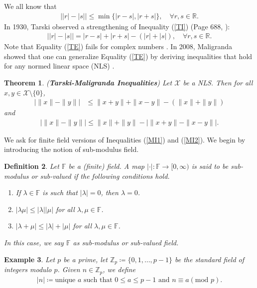 \documentclass{amsart}
\newtheorem{theorem}{Theorem}[section]
\newtheorem{definition}[theorem]{Definition}
\newtheorem{example}[theorem]{Example}
\begin{document}
We all know that 
\begin{align}\label{TI}
	\bigg||r|-|s|\bigg|\leq \min\{|r-s|, |r+s|\}, \quad \forall r, s \in \mathbb{R}.
\end{align}
In 1930, Tarski observed  a strengthening of Inequality (\ref{TI}) (Page 688, \cite{TARSKI}):
\begin{align}\label{TE}
		\bigg||r|-|s|\bigg|=|r-s|+ |r+s|-(|r|+|s|), \quad \forall r, s \in \mathbb{R}.
\end{align}
Note that  Equality (\ref{TE}) fails for complex numbers \cite{MALIGRANDA}. In 2008, Maligranda showed that one can generalize Equality (\ref{TE}) by deriving  inequalities that hold for any normed linear space (NLS) \cite{MALIGRANDA}.
\begin{theorem} \cite{MALIGRANDA} \label{MT} (\textbf{Tarski-Maligranda Inequalities})
Let $\mathcal{X}$ be a NLS. Then for all $x, y \in \mathcal{X}\setminus\{0\}$, 
\begin{align}\label{MI1}
	\bigg|\|x\|-\|y\|\bigg|&\leq \|x+y\|+\|x-y\|-(\|x\|+\|y\|)
\end{align}
and 
\begin{align}\label{MI2}
	\bigg|\|x\|-\|y\|\bigg|\leq \|x\|+\|y\|-\bigg|\|x+y\|-\|x-y\|\bigg|.
\end{align}
\end{theorem}
We ask for finite field versions of Inequalities (\ref{MI1}) and (\ref{MI2}). 
We begin by introducing the notion of sub-modulus field. 
\begin{definition}
	Let $\mathbb{F}$ be a  (finite) field. A map $|\cdot|: \mathbb{F}\to [0, \infty)$ is said to be sub-modulus or sub-valued if the following conditions hold.
	\begin{enumerate}[\upshape (i)]
		\item If $\lambda  \in \mathbb{F}$ is such that $|\lambda|=0$, then $\lambda=0$.
		\item $|\lambda \mu|\leq |\lambda||\mu|$ for all $\lambda, \mu \in \mathbb{F}$.
		\item $|\lambda +\mu|\leq |\lambda|+|\mu|$ for all $\lambda, \mu \in \mathbb{F}$.
	\end{enumerate} 
	In this case, we say $\mathbb{F}$ as sub-modulus or sub-valued field. 
\end{definition}
\begin{example}
	Let $p$ be a prime, let $\mathbb{Z}_p\coloneqq \{0, 1, \dots, p-1\}$ be the standard field of integers modulo $p$. Given $n \in \mathbb{Z}_p$, we define 
	\begin{align*}
		|n|\coloneqq \text{unique } a \text{ such that } 0\leq a \leq p-1 \text{ and }n \equiv a (\text{mod }p).
	\end{align*}
\end{example}
\end{document}
